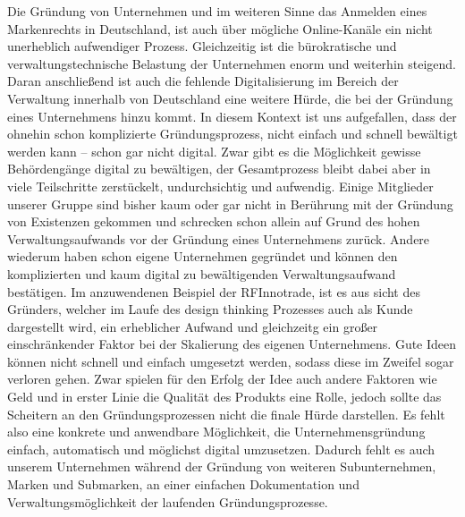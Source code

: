 Die Gründung von Unternehmen und im weiteren Sinne das Anmelden eines Markenrechts in Deutschland, ist auch über mögliche Online-Kanäle ein nicht unerheblich aufwendiger Prozess.
Gleichzeitig ist die bürokratische und verwaltungstechnische Belastung der Unternehmen enorm und weiterhin steigend. Daran anschließend ist auch die fehlende Digitalisierung im Bereich der Verwaltung innerhalb von Deutschland eine weitere Hürde, die bei der Gründung eines Unternehmens hinzu kommt.
In diesem Kontext ist uns aufgefallen, dass der ohnehin schon komplizierte Gründungsprozess, nicht einfach und schnell bewältigt werden kann – schon gar nicht digital. Zwar gibt es die Möglichkeit gewisse Behördengänge digital zu bewältigen, der Gesamtprozess bleibt dabei aber in viele Teilschritte zerstückelt, undurchsichtig und aufwendig.
Einige Mitglieder unserer Gruppe sind bisher kaum oder gar nicht in Berührung mit der Gründung von Existenzen gekommen und schrecken schon allein auf Grund des hohen Verwaltungsaufwands vor der Gründung eines Unternehmens zurück. Andere wiederum haben schon eigene Unternehmen gegründet und können den komplizierten und kaum digital zu bewältigenden Verwaltungsaufwand bestätigen.
Im anzuwendenen Beispiel der RFInnotrade, ist es aus sicht des Gründers, welcher im Laufe des design thinking Prozesses auch als Kunde dargestellt wird, ein erheblicher Aufwand und gleichzeitg ein großer einschränkender Faktor bei der Skalierung des eigenen Unternehmens. Gute Ideen können nicht schnell und einfach umgesetzt werden, sodass diese im Zweifel sogar verloren gehen.
Zwar spielen für den Erfolg der Idee auch andere Faktoren wie Geld und in erster Linie die Qualität des Produkts eine Rolle, jedoch sollte das Scheitern an den Gründungsprozessen nicht die finale Hürde darstellen.
Es fehlt also eine konkrete und anwendbare Möglichkeit, die Unternehmensgründung einfach, automatisch und möglichst digital umzusetzen. Dadurch fehlt es auch unserem Unternehmen während der Gründung von weiteren Subunternehmen, Marken und Submarken, an einer einfachen Dokumentation und Verwaltungsmöglichkeit der laufenden Gründungsprozesse.